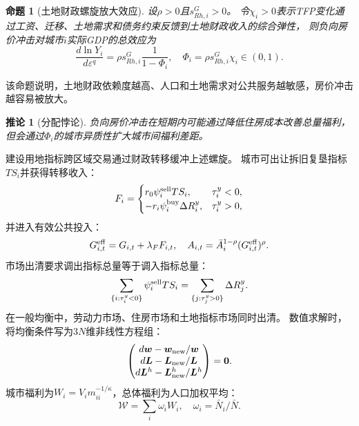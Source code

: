 \documentclass[UTF8,a4paper,12pt]{ctexart}
\theoremstyle{plain}
\newtheorem{proposition}{命题}
\newtheorem{corollary}{推论}
\theoremstyle{definition}
\theoremstyle{remark}
\newcommand{\Ry}{R^{y}}
\newcommand{\tauy}{\tau^{y}}
\begin{document}
\begin{proposition}[土地财政螺旋放大效应]
  \label{prop:spiral}
  设$\rho>0$且$s_{Rh,i}^G>0$。
  令$\chi_i>0$表示TFP变化通过工资、迁移、土地需求和债务约束反馈到土地财政收入的综合弹性，
  则负向房价冲击对城市$i$实际GDP的总效应为
  \begin{equation}
    \frac{d\ln Y_i}{d\varepsilon^q}=\rho s_{Rh,i}^G\frac{1}{1-\Phi_i},
    \quad \Phi_i=\rho s_{Rh,i}^G\chi_i\in(0,1).
    \label{eq:spiral}
  \end{equation}
\end{proposition}
该命题说明，土地财政依赖度越高、人口和土地需求对公共服务越敏感，房价冲击越容易被放大。
\begin{corollary}[分配悖论]
  \label{cor:paradox}
  负向房价冲击在短期内可能通过降低住房成本改善总量福利，
  但会通过$\Phi_i$的城市异质性扩大城市间福利差距。
\end{corollary}

建设用地指标跨区域交易通过财政转移缓冲上述螺旋。
城市可出让拆旧复垦指标$TS_i$并获得转移收入：
\begin{equation}
  F_i=\begin{cases}
    r_0\psi_i^{\rm sell}TS_i, & \tauy_i<0,\\
    -r_i\psi_i^{\rm buy}\Delta\Ry_i, & \tauy_i>0,
  \end{cases}
  \label{eq:transfer}
\end{equation}
并进入有效公共投入：
\begin{equation}
  G_{i,t}^{\rm eff}=G_{i,t}+\lambda_FF_{i,t},
  \quad A_{i,t}=\bar{A}_i^{1-\rho}(G_{i,t}^{\rm eff})^\rho.
  \label{eq:G_transfer}
\end{equation}
市场出清要求调出指标总量等于调入指标总量：
\begin{equation}
  \sum_{\{i:\tauy_i<0\}}\psi_i^{\rm sell}TS_i
  =\sum_{\{j:\tauy_j>0\}}\Delta\Ry_j.
  \label{eq:land_clearing}
\end{equation}
在一般均衡中，劳动力市场、住房市场和土地指标市场同时出清。
数值求解时，将均衡条件写为$3N$维非线性方程组：
\begin{equation}
  \begin{pmatrix}
    d\bm{w}-\bm{w}_{\rm new}/\bm{w}\\
    d\bm{L}-\bm{L}_{\rm new}/\bm{L}\\
    d\bm{L}^h-\bm{L}_{\rm new}^h/\bm{L}^h
  \end{pmatrix}=\bm{0}.
  \label{eq:equilibrium}
\end{equation}
城市福利为$W_i=V_i m_{ii}^{-1/\kappa}$，总体福利为人口加权平均：
\begin{equation}
  \mathcal{W}=\sum_i\omega_iW_i, \quad \omega_i=\bar{N}_i/\bar{N}.
  \label{eq:city_welfare}
\end{equation}
\end{document}
